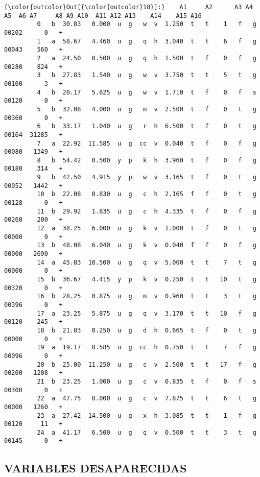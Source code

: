 \documentclass[11pt]{article}
\begin{document}
\begin{Verbatim}[commandchars=\\\{\}]
{\color{outcolor}Out[{\color{outcolor}18}]:}    A1     A2      A3 A4 A5  A6 A7     A8 A9 A10  A11 A12 A13    A14    A15 A16
         0   b  30.83   0.000  u  g   w  v  1.250  t   t    1   f   g  00202      0   +
         1   a  58.67   4.460  u  g   q  h  3.040  t   t    6   f   g  00043    560   +
         2   a  24.50   0.500  u  g   q  h  1.500  t   f    0   f   g  00280    824   +
         3   b  27.83   1.540  u  g   w  v  3.750  t   t    5   t   g  00100      3   +
         4   b  20.17   5.625  u  g   w  v  1.710  t   f    0   f   s  00120      0   +
         5   b  32.08   4.000  u  g   m  v  2.500  t   f    0   t   g  00360      0   +
         6   b  33.17   1.040  u  g   r  h  6.500  t   f    0   t   g  00164  31285   +
         7   a  22.92  11.585  u  g  cc  v  0.040  t   f    0   f   g  00080   1349   +
         8   b  54.42   0.500  y  p   k  h  3.960  t   f    0   f   g  00180    314   +
         9   b  42.50   4.915  y  p   w  v  3.165  t   f    0   t   g  00052   1442   +
         10  b  22.08   0.830  u  g   c  h  2.165  f   f    0   t   g  00128      0   +
         11  b  29.92   1.835  u  g   c  h  4.335  t   f    0   f   g  00260    200   +
         12  a  38.25   6.000  u  g   k  v  1.000  t   f    0   t   g  00000      0   +
         13  b  48.08   6.040  u  g   k  v  0.040  f   f    0   f   g  00000   2690   +
         14  a  45.83  10.500  u  g   q  v  5.000  t   t    7   t   g  00000      0   +
         15  b  36.67   4.415  y  p   k  v  0.250  t   t   10   t   g  00320      0   +
         16  b  28.25   0.875  u  g   m  v  0.960  t   t    3   t   g  00396      0   +
         17  a  23.25   5.875  u  g   q  v  3.170  t   t   10   f   g  00120    245   +
         18  b  21.83   0.250  u  g   d  h  0.665  t   f    0   t   g  00000      0   +
         19  a  19.17   8.585  u  g  cc  h  0.750  t   t    7   f   g  00096      0   +
         20  b  25.00  11.250  u  g   c  v  2.500  t   t   17   f   g  00200   1208   +
         21  b  23.25   1.000  u  g   c  v  0.835  t   f    0   f   s  00300      0   +
         22  a  47.75   8.000  u  g   c  v  7.875  t   t    6   t   g  00000   1260   +
         23  a  27.42  14.500  u  g   x  h  3.085  t   t    1   f   g  00120     11   +
         24  a  41.17   6.500  u  g   q  v  0.500  t   t    3   t   g  00145      0   +
\end{Verbatim}
            
    \subsection{VARIABLES DESAPARECIDAS}\label{variables-desaparecidas}
\end{document}
